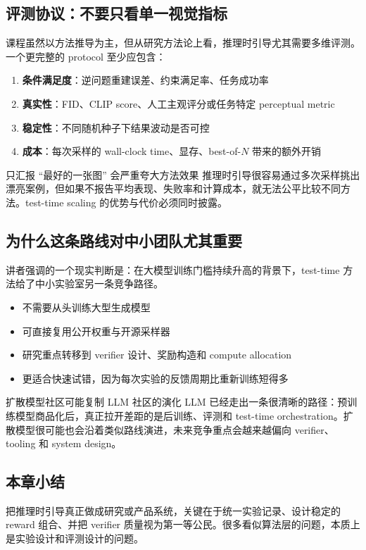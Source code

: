 \subsection{评测协议：不要只看单一视觉指标}

课程虽然以方法推导为主，但从研究方法论上看，推理时引导尤其需要多维评测。一个更完整的 protocol 至少应包含：

\begin{enumerate}
    \item \textbf{条件满足度}：逆问题重建误差、约束满足率、任务成功率
    \item \textbf{真实性}：FID、CLIP score、人工主观评分或任务特定 perceptual metric
    \item \textbf{稳定性}：不同随机种子下结果波动是否可控
    \item \textbf{成本}：每次采样的 wall-clock time、显存、best-of-$N$ 带来的额外开销
\end{enumerate}

\begin{warningbox}{只汇报 ``最好的一张图'' 会严重夸大方法效果}
推理时引导很容易通过多次采样挑出漂亮案例，但如果不报告平均表现、失败率和计算成本，就无法公平比较不同方法。test-time scaling 的优势与代价必须同时披露。
\end{warningbox}

\subsection{为什么这条路线对中小团队尤其重要}

讲者强调的一个现实判断是：在大模型训练门槛持续升高的背景下，test-time 方法给了中小实验室另一条竞争路径。

\begin{itemize}
    \item 不需要从头训练大型生成模型
    \item 可直接复用公开权重与开源采样器
    \item 研究重点转移到 verifier 设计、奖励构造和 compute allocation
    \item 更适合快速试错，因为每次实验的反馈周期比重新训练短得多
\end{itemize}

\begin{knowledgebox}{扩散模型社区可能复制 LLM 社区的演化}
LLM 已经走出一条很清晰的路径：预训练模型商品化后，真正拉开差距的是后训练、评测和 test-time orchestration。扩散模型很可能也会沿着类似路线演进，未来竞争重点会越来越偏向 verifier、tooling 和 system design。
\end{knowledgebox}

\subsection{本章小结}

把推理时引导真正做成研究或产品系统，关键在于统一实验记录、设计稳定的 reward 组合、并把 verifier 质量视为第一等公民。很多看似算法层的问题，本质上是实验设计和评测设计的问题。

